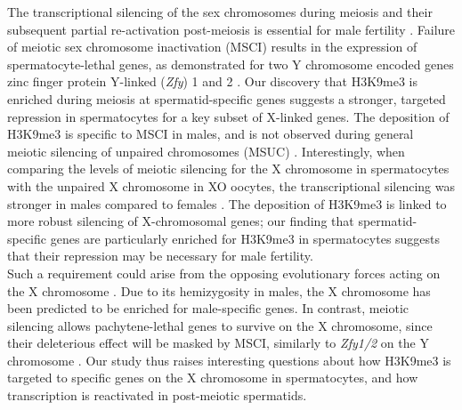 The transcriptional silencing of the sex chromosomes during meiosis and their subsequent partial re-activation post-meiosis is essential for male fertility \citep{Mahadevaiah2008}. Failure of meiotic sex chromosome inactivation (MSCI) results in the expression of spermatocyte-lethal genes, as demonstrated for two Y chromosome encoded genes zinc finger protein Y-linked (\textit{Zfy}) 1 and 2 \citep{Royo2010}. Our discovery that H3K9me3 is enriched during meiosis at spermatid-specific genes suggests a stronger, targeted repression in spermatocytes for a key subset of X-linked genes. The deposition of H3K9me3 is specific to MSCI in males, and is not observed during general meiotic silencing of unpaired chromosomes (MSUC) \citep{Cloutier2016, Taketo2013, Turner2004a}. Interestingly, when comparing the levels of meiotic silencing for the X chromosome in spermatocytes with the unpaired X chromosome in XO oocytes, the transcriptional silencing was stronger in males compared to females \citep{Cloutier2016}. The deposition of H3K9me3 is linked to more robust silencing of X-chromosomal genes; our finding that spermatid-specific genes are particularly enriched for H3K9me3 in spermatocytes suggests that their repression may be necessary for male fertility. \\

Such a requirement could arise from the opposing evolutionary forces acting on the X chromosome \citep{Rice1992}. Due to its hemizygosity in males, the X chromosome has been predicted to be enriched for male-specific genes. In contrast, meiotic silencing allows pachytene-lethal genes to survive on the X chromosome, since their deleterious effect will be masked by MSCI, similarly to \textit{Zfy1/2} on the Y chromosome \citep{Royo2010}. Our study thus raises interesting questions about how H3K9me3 is targeted to specific genes on the X chromosome in spermatocytes, and how transcription is reactivated in post-meiotic spermatids.



